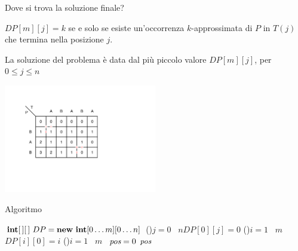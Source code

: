 \begin{frame}{Dove si trova la soluzione finale?}

\vspace{-6pt}
\BIL
\item $DP[m][j] = k$ se e solo se esiste un'occorrenza $k$-approssimata di $P$ in $T(j)$ che
termina nella posizione $j$.
\item La soluzione del problema è data dal più piccolo valore $DP[m][j]$, per $0 \leq j \leq n$
\EIL

\begin{center}
\includegraphics[width=0.5\textwidth]{stringmatching2.pdf}
\end{center}

\end{frame}

\begin{frame}{Algoritmo}

\small
\vspace{-6pt}
\begin{Procedure}
\caption[A]{\INTEGER\ \stringmatching($\Item[\,]\ P,\ \Item[\,]\ T,\ \INTEGER\ m,\ \INTEGER\ n$)}

$\INTARRAY[\,]\ DP = \NEW\ \INTEGER[0 \mldots m][ 0 \mldots n]$\;
\lFor(){$j = 0$ \TO\ $n$}{$DP[0][j] = 0$}
\lFor(){$i = 1$ \TO\ $m$}{$DP[i][0] = i$}
\For(){$i = 1$ \TO\ $m$}{
}
\INTEGER\ $\textit{pos} = 0$
\Return $\textit{pos}$\;
\end{Procedure}

\end{frame}

